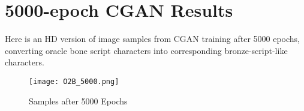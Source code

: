 \chapter{5000-epoch CGAN Results}\label{ch:appendix_3}
Here is an HD version of image samples from CGAN training after 5000 epochs, converting oracle bone script characters into corresponding bronze-script-like characters.
\begin{figure}[h]
	\centering
	\texttt{[image: O2B\_5000.png]}
	\caption{\label{fig:O2B_5000} Samples after 5000 Epochs}
\end{figure}